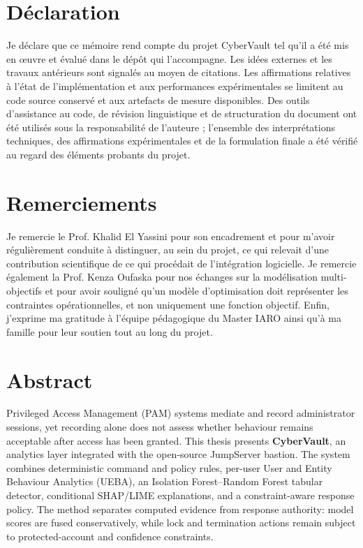 \documentclass[11pt,a4paper,oneside]{report}
\theoremstyle{definition}
\theoremstyle{plain}
\begin{document}
\chapter*{Déclaration}
Je déclare que ce mémoire rend compte du projet CyberVault tel qu'il a été mis en œuvre et évalué dans le dépôt qui l'accompagne. Les idées externes et les travaux antérieurs sont signalés au moyen de citations. Les affirmations relatives à l'état de l'implémentation et aux performances expérimentales se limitent au code source conservé et aux artefacts de mesure disponibles. Des outils d'assistance au code, de révision linguistique et de structuration du document ont été utilisés sous la responsabilité de l'auteure ; l'ensemble des interprétations techniques, des affirmations expérimentales et de la formulation finale a été vérifié au regard des éléments probants du projet.

\chapter*{Remerciements}
Je remercie le Prof. Khalid El Yassini pour son encadrement et pour m'avoir régulièrement conduite à distinguer, au sein du projet, ce qui relevait d'une contribution scientifique de ce qui procédait de l'intégration logicielle. Je remercie également la Prof. Kenza Oufaska pour nos échanges sur la modélisation multi-objectifs et pour avoir souligné qu'un modèle d'optimisation doit représenter les contraintes opérationnelles, et non uniquement une fonction objectif. Enfin, j'exprime ma gratitude à l'équipe pédagogique du Master IARO ainsi qu'à ma famille pour leur soutien tout au long du projet.

\chapter*{Abstract}
Privileged Access Management (PAM) systems mediate and record administrator sessions, yet recording alone does not assess whether behaviour remains acceptable after access has been granted. This thesis presents \textbf{CyberVault}, an analytics layer integrated with the open-source JumpServer bastion. The system combines deterministic command and policy rules, per-user User and Entity Behaviour Analytics (UEBA), an Isolation Forest--Random Forest tabular detector, conditional SHAP/LIME explanations, and a constraint-aware response policy. The method separates computed evidence from response authority: model scores are fused conservatively, while lock and termination actions remain subject to protected-account and confidence constraints.
\end{document}

